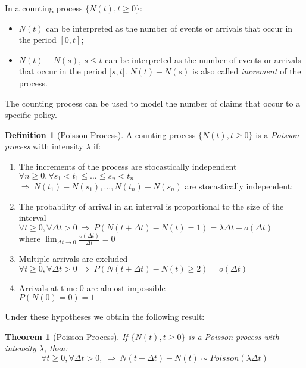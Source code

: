 \documentclass[a4paper, twoside, openright, 12pt]{report}
\newcommand\omicron{o}
\providecommand{\tightlist}{%
  \setlength{\itemsep}{0pt}\setlength{\parskip}{0pt}}
\newtheorem{theorem}{Theorem}[chapter]
\theoremstyle{definition}
\newtheorem{definition}{Definition}[chapter]
\theoremstyle{definition}
\theoremstyle{definition}
\theoremstyle{remark}
\begin{document}
In a counting process \(\{N(t), t\ge0\}\):

\begin{itemize}
\tightlist
\item
  \(N(t)\) can be interpreted as the number of events or arrivals that occur in the period \([0, t]\);
\item
  \(N(t) - N(s), \ s\le t\) can be interpreted as the number of events or arrivals that occur in the period \(]s, t]\). \(N(t) - N(s)\) is also called \emph{increment} of the process.
\end{itemize}

The counting process can be used to model the number of claims that occur to a specific policy.

\begin{definition}[Poisson Process]
\label{def:def-process-poisson} \iffalse (Poisson Process) \fi{} A counting process \(\{N(t), t\ge0\}\) is a \textit{Poisson process} with intensity \(\lambda\) if:

\begin{enumerate}
\item The increments of the process are stocastically independent \\
      $\forall n\ge0, \forall s_1 < t_1 \le \dots \le s_n < t_n$ \\
      $\Rightarrow \ N(t_1)-N(s_1), \dots, N(t_n)-N(s_n)$ are stocastically independent;
\item The probability of arrival in an interval is proportional to the size of the interval \\
      $\forall t\ge 0, \forall \Delta t >0 \ \Rightarrow \ P\left( N(t + \Delta t) - N(t) = 1 \right) = \lambda \Delta t + \omicron (\Delta t)$ \\
      where $\lim_{\Delta t \to 0}{\frac{\omicron(\Delta t)}{\Delta t}} = 0$
\item Multiple arrivals are excluded \\
      $\forall t\ge 0, \forall \Delta t >0 \ \Rightarrow \ P\left( N(t + \Delta t) - N(t) \ge 2 \right) = \omicron (\Delta t)$
\item Arrivals at time $0$ are almost impossible \\
      $P\left( N(0) = 0 \right) = 1 $
\end{enumerate}
\end{definition}

Under these hypotheses we obtain the following result:

\begin{theorem}[Poisson Process]
\label{thm:th-process-poisson} \iffalse (Poisson Process) \fi{} If \(\{N(t), t\ge 0 \}\) is a Poisson process with intensity \(\lambda\), then:
\[\forall t\ge 0, \forall \Delta t >0, \ \Rightarrow \ N(t + \Delta t) - N(t) \sim Poisson(\lambda \Delta t)\]
\end{theorem}
\end{document}
